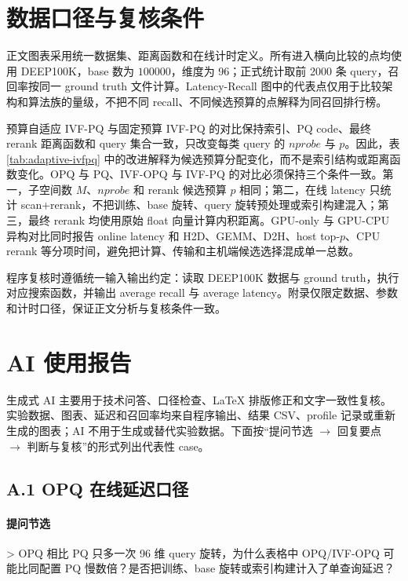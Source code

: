 \documentclass[a4paper,11pt,UTF8]{ctexart}
\begin{document}
\clearpage
\appendix

\section{数据口径与复核条件}

正文图表采用统一数据集、距离函数和在线计时定义。所有进入横向比较的点均使用 DEEP100K，base 数为 $100000$，维度为 96；正式统计取前 2000 条 query，召回率按同一 ground truth 文件计算。Latency-Recall 图中的代表点仅用于比较架构和算法族的量级，不把不同 recall、不同候选预算的点解释为同召回排行榜。

预算自适应 IVF-PQ 与固定预算 IVF-PQ 的对比保持索引、PQ code、最终 rerank 距离函数和 query 集合一致，只改变每类 query 的 $nprobe$ 与 $p$。因此，表 \ref{tab:adaptive-ivfpq} 中的改进解释为候选预算分配变化，而不是索引结构或距离函数变化。OPQ 与 PQ、IVF-OPQ 与 IVF-PQ 的对比必须保持三个条件一致。第一，子空间数 $M$、$nprobe$ 和 rerank 候选预算 $p$ 相同；第二，在线 latency 只统计 scan+rerank，不把训练、base 旋转、query 旋转预处理或索引构建混入；第三，最终 rerank 均使用原始 float 向量计算内积距离。GPU-only 与 GPU-CPU 异构对比同时报告 online latency 和 H2D、GEMM、D2H、host top-$p$、CPU rerank 等分项时间，避免把计算、传输和主机端候选选择混成单一总数。

程序复核时遵循统一输入输出约定：读取 DEEP100K 数据与 ground truth，执行对应搜索函数，并输出 average recall 与 average latency。附录仅限定数据、参数和计时口径，保证正文分析与复核条件一致。

\section*{AI 使用报告}

生成式 AI 主要用于技术问答、口径检查、\LaTeX{} 排版修正和文字一致性复核。实验数据、图表、延迟和召回率均来自程序输出、结果 CSV、profile 记录或重新生成的图表；AI 不用于生成或替代实验数据。下面按“提问节选 $\to$ 回复要点 $\to$ 判断与复核”的形式列出代表性 case。

\subsection*{A.1 OPQ 在线延迟口径}

\paragraph{提问节选}

> OPQ 相比 PQ 只多一次 96 维 query 旋转，为什么表格中 OPQ/IVF-OPQ 可能比同配置 PQ 慢数倍？是否把训练、base 旋转或索引构建计入了单查询延迟？
\end{document}
